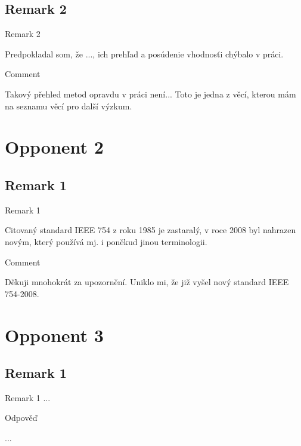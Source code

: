 \documentclass[a4paper]{beamer}
\begin{document}
\subsection{Remark 2}
\begin{frame}
\begin{block}{Remark 2}
\begin{otherlanguage}{slovak}
Predpokladal som, že ..., ich prehľad a posúdenie vhodnosťi chýbalo v práci.
\end{otherlanguage}
\end{block}
\begin{exampleblock}{Comment}
\begin{otherlanguage}{czech}
Takový přehled metod opravdu v práci není... Toto je jedna z věcí, kterou mám na seznamu věcí pro další výzkum.
\end{otherlanguage}
\end{exampleblock}
\end{frame}


\section{Opponent 2}
\subsection{Remark 1}
\begin{frame}
\begin{block}{Remark 1}
\begin{otherlanguage}{czech}
Citovaný standard IEEE 754 z roku 1985 je zastaralý, v roce 2008 byl nahrazen novým, který používá mj. i poněkud jinou terminologii.
\end{otherlanguage}
\end{block}
\begin{exampleblock}{Comment}
\begin{otherlanguage}{czech}
Děkuji mnohokrát za upozornění. Uniklo mi, že již vyšel nový standard IEEE 754-2008.
\end{otherlanguage}
\end{exampleblock}
\end{frame}

\section{Opponent 3}
\subsection{Remark 1}
\begin{frame}
\begin{block}{Remark 1}
...
\end{block}
\begin{exampleblock}{Odpověď}
\begin{otherlanguage}{czech}
...
\end{otherlanguage}
\end{exampleblock}
\end{frame}
\end{document}
